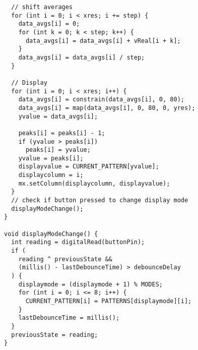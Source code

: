 \documentclass[12pt, a4paper]{article}
\begin{document}
\begin{verbatim}
  // shift averages
  for (int i = 0; i < xres; i += step) {
    data_avgs[i] = 0;
    for (int k = 0; k < step; k++) {
      data_avgs[i] = data_avgs[i] + vReal[i + k];
    }
    data_avgs[i] = data_avgs[i] / step;
  }

  // Display
  for (int i = 0; i < xres; i++) {
    data_avgs[i] = constrain(data_avgs[i], 0, 80);
    data_avgs[i] = map(data_avgs[i], 0, 80, 0, yres);
    yvalue = data_avgs[i];

    peaks[i] = peaks[i] - 1;
    if (yvalue > peaks[i])
      peaks[i] = yvalue;
    yvalue = peaks[i];
    displayvalue = CURRENT_PATTERN[yvalue];
    displaycolumn = i;
    mx.setColumn(displaycolumn, displayvalue);
  }
  // check if button pressed to change display mode
  displayModeChange();
}

void displayModeChange() {
  int reading = digitalRead(buttonPin);
  if (
    reading ^ previousState &&
    (millis() - lastDebounceTime) > debounceDelay
  ) {
    displaymode = (displaymode + 1) % MODES;
    for (int i = 0; i <= 8; i++) {
      CURRENT_PATTERN[i] = PATTERNS[displaymode][i];
    }
    lastDebounceTime = millis();
  }
  previousState = reading;
}
\end{verbatim}

\vspace*{1cm}

\vspace*{1cm}
\end{document}

